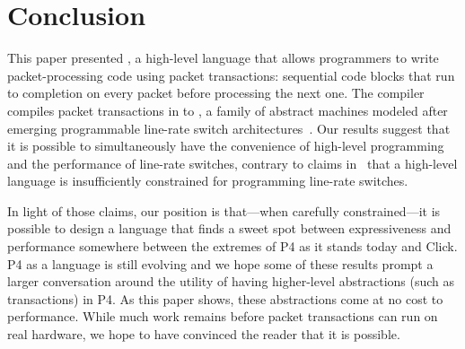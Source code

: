 \section{Conclusion}
\label{s:conclusion}

This paper presented \pktlanguage, a high-level language that allows
programmers to write packet-processing code using packet transactions:
sequential code blocks that run to completion on every packet before processing
the next one. The \pktlanguage compiler compiles packet transactions in
\pktlanguage to \absmachine, a family of abstract machines modeled after
emerging programmable line-rate switch architectures~\cite{flexpipe, xpliant,
rmt}. Our results suggest that it is possible to simultaneously have the
convenience of high-level programming and the performance of line-rate
switches, contrary to claims in~\cite{p4} that a high-level language is
insufficiently constrained for programming line-rate switches.

In light of those claims, our position is that---when carefully
constrained---it is possible to design a language that finds a sweet spot
between expressiveness and performance somewhere between the extremes of P4 as
it stands today and Click. P4 as a language is still evolving and we hope some
of these results prompt a larger conversation around the utility of having
higher-level abstractions (such as transactions) in P4. As this paper shows,
these abstractions come at no cost to performance. While much work remains
before packet transactions can run on real hardware, we hope to have convinced
the reader that it is possible.
